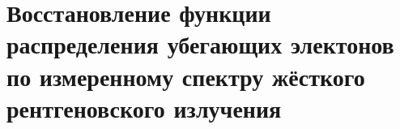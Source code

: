 \chapter{Восстановление функции распределения убегающих электонов по измеренному спектру жёсткого рентгеновского излучения}\label{ch:ch4}

\FloatBarrier
